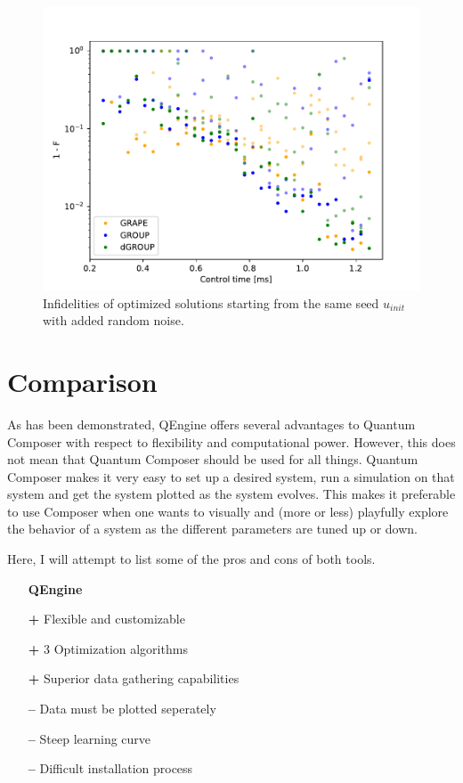 \documentclass[a4paper, twocolumn]{revtex4-1}
\begin{document}
\begin{figure}
	\includegraphics[width=\columnwidth]{graphics/qengine/noiseDemoInf.pdf}
	\caption{Infidelities of  optimized solutions starting from the same seed $u_{init}$ with added random noise. }
	\label{fig:QEngine_noise}
\end{figure}

\section{Comparison}\label{sec:comparison}
As has been demonstrated, QEngine offers several advantages to Quantum Composer with respect to flexibility and computational power. However, this does not mean that Quantum Composer should be used for all things. Quantum Composer makes it very easy to set up a desired system, run a simulation on that system and get the system plotted as the system evolves. This makes it preferable to use Composer when one wants to visually and (more or less) playfully explore the behavior of a system as the different parameters are tuned up or down.

Here, I will attempt to list some of the pros and cons of both tools.
\begin{itemize}
	\item[] \textbf{QEngine} 
	\item[\bf+] Flexible and customizable
	\item[\bf+] 3 Optimization algorithms
	\item[\bf+] Superior data gathering capabilities
	\item[\bf{--}] Data must be plotted seperately
	\item[\bf{--}] Steep learning curve
	\item[\bf{--}] Difficult installation process
\end{itemize}
\end{document}
